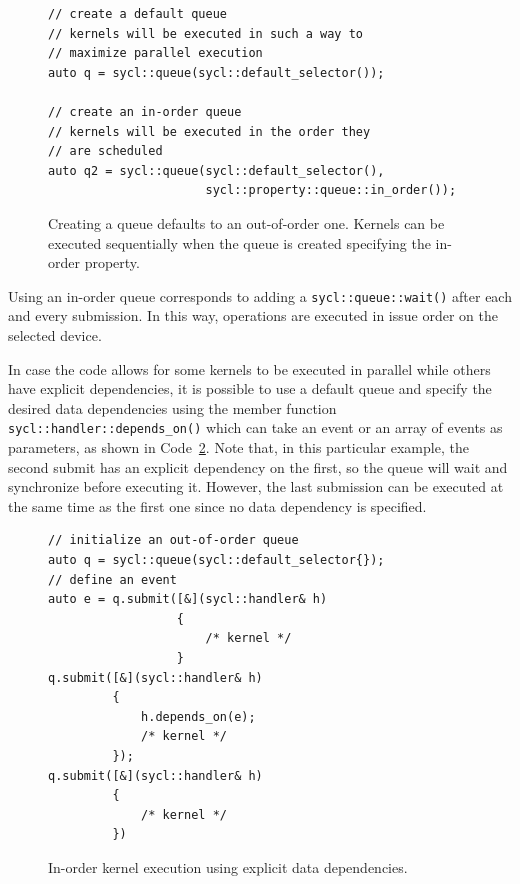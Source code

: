\begin{figure}[ht!]
\renewcommand{\figurename}{Code}
\begin{verbatim}
// create a default queue
// kernels will be executed in such a way to 
// maximize parallel execution
auto q = sycl::queue(sycl::default_selector());

// create an in-order queue
// kernels will be executed in the order they
// are scheduled
auto q2 = sycl::queue(sycl::default_selector(),
                      sycl::property::queue::in_order());
\end{verbatim}
\caption{Creating a queue defaults to an out-of-order one. Kernels can be executed sequentially when the queue is created specifying the in-order property.}
\label{code:in_order_queue}
\end{figure}

Using an in-order queue corresponds to adding a \texttt{sycl::queue::wait()} after each and every submission. In this way, operations are executed in issue order on the selected device.

In case the code allows for some kernels to be executed in parallel while others have explicit dependencies, it is possible to use a default queue and specify the desired data dependencies using the member function \texttt{sycl::handler::depends\_on()} which can take an event or an array of events as parameters, as shown in Code~\ref{code:depens_on}. Note that, in this particular example, the second submit has an explicit dependency on the first, so the queue will wait and synchronize before executing it. However, the last submission can be executed at the same time as the first one since no data dependency is specified.

\begin{figure}[ht!]
\renewcommand{\figurename}{Code}
\begin{verbatim}
// initialize an out-of-order queue
auto q = sycl::queue(sycl::default_selector{});
// define an event
auto e = q.submit([&](sycl::handler& h)
                  {
                      /* kernel */
                  }
q.submit([&](sycl::handler& h)
         {
             h.depends_on(e);
             /* kernel */
         });
q.submit([&](sycl::handler& h)
         {
             /* kernel */
         })
\end{verbatim}
\caption{In-order kernel execution using explicit data dependencies.}
\label{code:depens_on}
\end{figure}